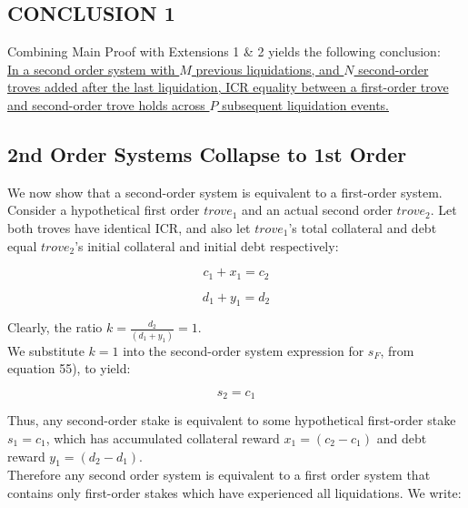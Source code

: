 \documentclass[reqno]{article}
\begin{document}
\subsection{CONCLUSION 1}

\bigskip
Combining Main Proof with Extensions 1 \& 2 yields the following conclusion:\\

\uline{In a second order system with $M$ previous liquidations, and $N$ second-order troves added after the last liquidation, ICR equality between a first-order trove and second-order trove holds across $P$ subsequent liquidation events.}\\

\subsection{2nd Order Systems Collapse to 1st Order}
We now show that a second-order system is equivalent to a first-order system.\\

Consider a hypothetical first order $trove_1$ and an actual second order $trove_2$. Let both troves have identical ICR, and also let $trove_1$’s total collateral and debt equal $trove_2$’s initial collateral and initial debt respectively:

\begin{equation} 
    c_1+x_1=c_2
\end{equation}

\begin{equation} 
    d_1+y_1=d_2
\end{equation}

\bigskip
Clearly, the ratio  $k = \frac{d_2}{(d_1+y_1)} = 1$.\\

We substitute $k=1$ into the second-order system expression for $s_F$, from equation 55), to yield:

\begin{equation} 
    s_2=c_1
\end{equation}

\bigskip
Thus, any second-order stake is equivalent to some hypothetical first-order stake $s_1=c_1$, which has accumulated collateral reward $x_1=(c_2-c_1)$ and debt reward $y_1=(d_2-d_1)$.\\

Therefore any second order system is equivalent to a first order system that contains only first-order stakes which have experienced all liquidations. We write:
\end{document}
